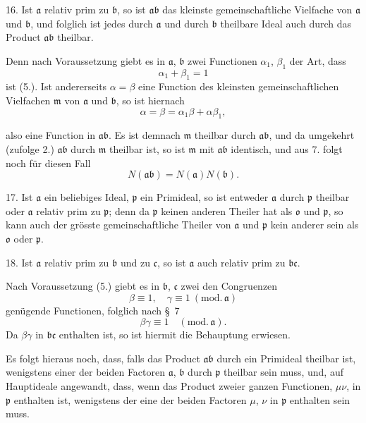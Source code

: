 \documentclass{article}
\begin{document}
16. Ist $\mathfrak{a}$ relativ prim zu $\mathfrak{b}$, so ist $\mathfrak{a}\mathfrak{b}$ das kleinste gemeinschaftliche Vielfache von $\mathfrak{a}$ und $\mathfrak{b}$, und folglich ist jedes durch $\mathfrak{a}$ und durch $\mathfrak{b}$ theilbare Ideal auch durch das Product $\mathfrak{a}\mathfrak{b}$ theilbar.

Denn nach Voraussetzung giebt es in $\mathfrak{a}$, $\mathfrak{b}$ zwei Functionen $\alpha_{1}$, $\beta_{1}$ der Art, dass
\[ \alpha_{1} + \beta_{1} = 1 \]
ist (5.). Ist andererseits $\alpha = \beta$ eine Function des kleinsten gemeinschaftlichen Vielfachen $\mathfrak{m}$ von $\mathfrak{a}$ und $\mathfrak{b}$, so ist hiernach
\[ \alpha = \beta = \alpha_{1}\beta + \alpha\beta_{1}, \]

also eine Function in $\mathfrak{a}\mathfrak{b}$. Es ist demnach $\mathfrak{m}$ theilbar durch $\mathfrak{a}\mathfrak{b}$, und da umgekehrt (zufolge 2.) $\mathfrak{a}\mathfrak{b}$ durch $\mathfrak{m}$ theilbar ist, so ist $\mathfrak{m}$ mit $\mathfrak{a}\mathfrak{b}$ identisch, und aus 7. folgt noch für diesen Fall
\[ N(\mathfrak{a}\mathfrak{b}) = N(\mathfrak{a})N(\mathfrak{b}). \]

17. Ist $\mathfrak{a}$ ein beliebiges Ideal, $\mathfrak{p}$ ein Primideal, so ist entweder $\mathfrak{a}$ durch $\mathfrak{p}$ theilbar oder $\mathfrak{a}$ relativ prim zu $\mathfrak{p}$; denn da $\mathfrak{p}$ keinen anderen Theiler hat als $\mathfrak{o}$ und $\mathfrak{p}$, so kann auch der grösste gemeinschaftliche Theiler von $\mathfrak{a}$ und $\mathfrak{p}$ kein anderer sein als $\mathfrak{o}$ oder $\mathfrak{p}$.

18. Ist $\mathfrak{a}$ relativ prim zu $\mathfrak{b}$ und zu $\mathfrak{c}$, so ist $\mathfrak{a}$ auch relativ prim zu $\mathfrak{b}\mathfrak{c}$.

Nach Voraussetzung (5.) giebt es in $\mathfrak{b}$, $\mathfrak{c}$ zwei den Congruenzen
\[ \beta \equiv 1, \quad \gamma \equiv 1 \ (\text{mod.}\,\mathfrak{a}) \]
genügende Functionen, folglich nach §~7
\[ \beta\gamma \equiv 1 \quad (\text{mod.}\,\mathfrak{a}). \]
Da $\beta\gamma$ in $\mathfrak{b}\mathfrak{c}$ enthalten ist, so ist hiermit die Behauptung erwiesen.

Es folgt hieraus noch, dass, falls das Product $\mathfrak{a}\mathfrak{b}$ durch ein Primideal theilbar ist, wenigstens einer der beiden Factoren $\mathfrak{a}$, $\mathfrak{b}$ durch $\mathfrak{p}$ theilbar sein muss, und, auf Hauptideale angewandt, dass, wenn das Product zweier ganzen Functionen, $\mu\nu$, in $\mathfrak{p}$ enthalten ist, wenigstens der eine der beiden Factoren $\mu$, $\nu$ in $\mathfrak{p}$ enthalten sein muss.
\end{document}
